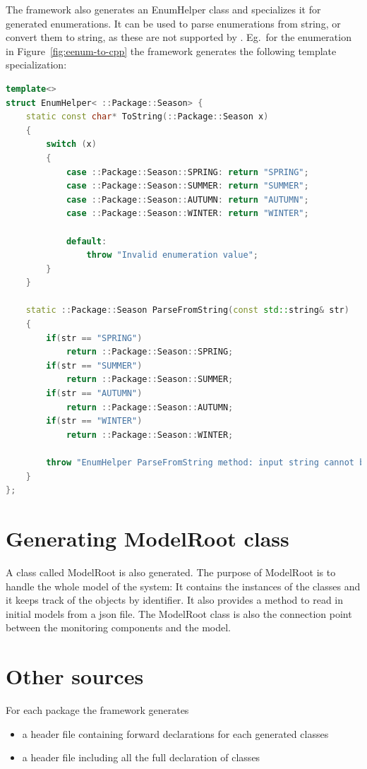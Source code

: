 The framework also generates an EnumHelper class and specializes it for generated enumerations. It can be used to  parse enumerations from string, or convert them to string, as these are not supported by \cpp{}. Eg.\ for the enumeration in Figure~\ref{fig:eenum-to-cpp} the framework generates the following template specialization:

\begin{minipage}{\textwidth}
\begin{lstlisting}[language=C++]
template<>
struct EnumHelper< ::Package::Season> {
	static const char* ToString(::Package::Season x)
	{
		switch (x)
		{
			case ::Package::Season::SPRING: return "SPRING";
			case ::Package::Season::SUMMER: return "SUMMER";
			case ::Package::Season::AUTUMN: return "AUTUMN";
			case ::Package::Season::WINTER: return "WINTER";
			
			default:
				throw "Invalid enumeration value";
		}
	}
	
	static ::Package::Season ParseFromString(const std::string& str)
	{
		if(str == "SPRING")
			return ::Package::Season::SPRING;
		if(str == "SUMMER")
			return ::Package::Season::SUMMER;
		if(str == "AUTUMN")
			return ::Package::Season::AUTUMN;
		if(str == "WINTER")
			return ::Package::Season::WINTER;
		
		throw "EnumHelper ParseFromString method: input string cannot be interpreted.";
	}
};
\end{lstlisting}
\end{minipage}


\section{ Generating ModelRoot class }

A class called ModelRoot is also generated.
The purpose of ModelRoot is to handle the whole model of the system: 
It contains the instances of the classes and it keeps track of the objects by identifier.
It also provides a method to read in initial models from a json file.
The ModelRoot class is also the connection point between the monitoring components and the model.

\section{ Other sources }

For each package the framework generates
\begin{itemize}
	\item a header file containing forward declarations for each generated classes
	\item a header file including all the full declaration of classes
\end{itemize} 

